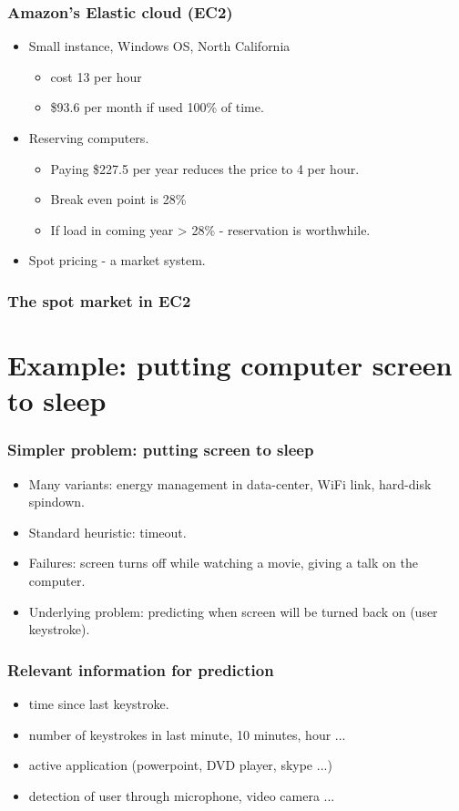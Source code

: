 \documentclass{beamer}
\newcommand{\blue}[1]{{\color{blue} #1}}
\begin{document}
\begin{frame}
\frametitle{Amazon's Elastic cloud (EC2)}
\begin{itemize}
\item Small instance, Windows OS, North California
\begin{itemize}
\item \blue{cost} {\textcent}13 per hour 
\item \$93.6 per month if used 100\% of time.
\end{itemize}
\item Reserving computers.
\begin{itemize}
\item Paying \$227.5 per year reduces the price to {\textcent}4 per
  hour.
\item Break even point is 28\%
\item If load in coming year > 28\% - reservation is worthwhile.
\end{itemize}
\item Spot pricing - a market system.
\end{itemize}
\end{frame}

\begin{frame}
\frametitle{The spot market in EC2}
\end{frame}

\section{Example: putting computer screen to sleep}

\begin{frame}
\frametitle{Simpler problem: putting screen to sleep}
\begin{itemize}
\item Many variants: energy management in data-center, WiFi link, hard-disk spindown.
\item Standard heuristic: timeout.
\item Failures: screen turns off while watching a movie, giving a talk
  on the computer.
\item Underlying problem: predicting when screen will be turned back
  on (user keystroke).
\end{itemize}
\end{frame}

\begin{frame}
\frametitle{Relevant information for prediction}
\begin{itemize}
\item time since last keystroke.
\item number of keystrokes in last minute, 10 minutes, hour ...
\item active application (powerpoint, DVD player, skype ...)
\item detection of user through microphone, video camera ...
\end{itemize}
\end{frame}
 
\end{document}

